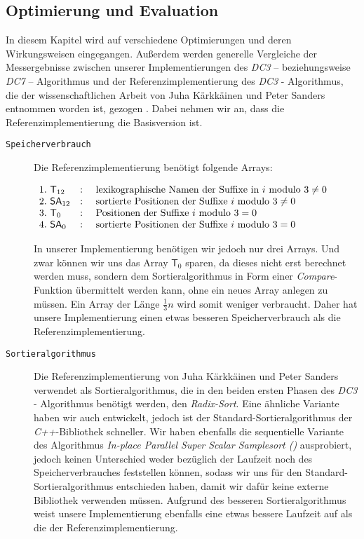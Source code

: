 \subsection{Optimierung und Evaluation}
\label{dc3:optim}

In  diesem Kapitel wird auf verschiedene Optimierungen und deren Wir\-kungs\-wei\-sen eingegangen. Außerdem werden generelle Vergleiche der Mess\-er\-geb\-nis\-se zwischen unserer Implementierungen des \emph{DC3} -- beziehungsweise \emph{DC7} -- Algorithmus und der Referenzimplementierung des \emph{DC3} - Algorithmus, die der wissenschaftlichen Arbeit von Juha Kärkkäinen und Peter Sanders entnommen worden ist, gezogen \cite[p.~954,955]{saca:9}. Dabei nehmen wir an, dass die Referenzimplementierung die Basisversion ist.

\begin{description}
	\item[\texttt{Speicherverbrauch}]

	Die Referenzimplementierung benötigt folgende Arrays:

	$\begin{array}{lcl}
	1. \text{  } \mathsf{T}_{12} & : & \text{ lexikographische Namen der Suffixe in } 	i \text{ modulo } 3 \neq 0\\
	2. \text{  } \sa_{12}& : & \text{ sortierte Positionen der Suffixe } 		i \text{ modulo } 3 \neq 0\\
	3. \text{  } \mathsf{T}_0	& : & \text{ Positionen der Suffixe } 					i \text{ modulo } 3 = 0\\
	4. \text{  } \sa_0	& : & \text{ sortierte Positionen der Suffixe } 		i \text{ modulo } 3 = 0
	\end{array}$

	In unserer Implementierung benötigen wir jedoch nur drei Arrays. Und zwar können wir uns das Array $\mathsf{T}_{0}$ sparen, da dieses nicht erst berechnet werden muss, sondern dem Sortieralgorithmus in Form einer \emph{Compare}-Funktion übermittelt werden kann, ohne ein neues Array anlegen zu müssen. Ein Array der Länge $\frac{1}{3}n$ wird somit weniger verbraucht. Daher hat unsere Implementierung einen etwas besseren Speicherverbrauch als die Referenzimplementierung.

	\item[\texttt{Sortieralgorithmus}]

	Die Referenzimplementierung von Juha Kärkkäinen und Peter Sanders verwendet als Sortieralgorithmus, die in den beiden ersten Phasen des \emph{DC3} - Algorithmus benötigt werden, den \emph{Radix-Sort}. Eine ähnliche Variante haben wir auch entwickelt, jedoch ist der Standard-Sortieralgorithmus der \emph{C++}-Bibliothek schneller. Wir haben ebenfalls die sequentielle Variante des Algorithmus \emph{In-place Parallel Super Scalar Samplesort (\ipsviero)} ausprobiert, jedoch keinen Unterschied weder bezüglich der Laufzeit noch des Speicherverbrauches feststellen können, sodass wir uns für den Standard-Sortieralgorithmus entschieden haben, damit wir dafür keine externe Bibliothek verwenden müssen. Aufgrund des besseren Sortieralgorithmus weist unsere Implementierung ebenfalls eine etwas bessere Laufzeit auf als die der Referenzimplementierung.


\end{description}
